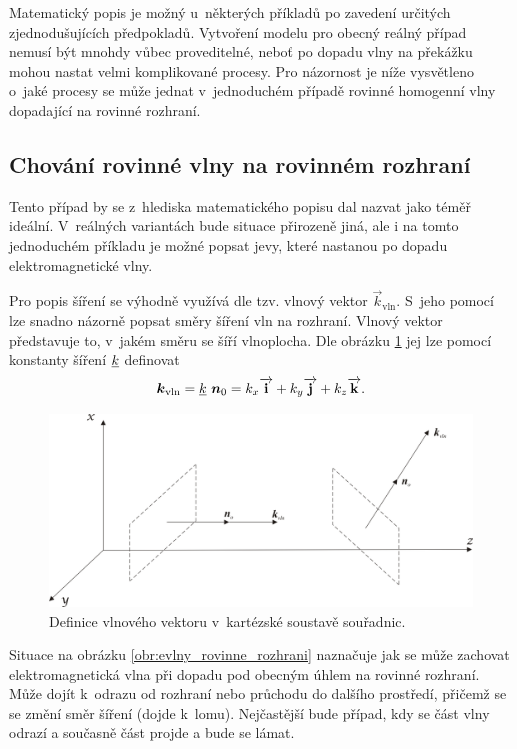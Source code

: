 Matematický popis je možný u~některých příkladů po zavedení určitých zjednodušujících předpokladů. Vytvoření modelu pro obecný reálný případ nemusí být mnohdy vůbec proveditelné, neboť po dopadu vlny na překážku mohou nastat velmi komplikované procesy. Pro názornost je níže vysvětleno o~jaké procesy se může jednat v~jednoduchém případě rovinné homogenní vlny dopadající na rovinné rozhraní.

\subsection*{Chování rovinné vlny na rovinném rozhraní}
Tento případ by se z~hlediska matematického popisu dal nazvat jako téměř ideální. V~reálných variantách bude situace přirozeně jiná, ale i na tomto jednoduchém příkladu je možné popsat jevy, které nastanou po dopadu elektromagnetické vlny. 

Pro popis šíření se výhodně využívá dle \cite[str.47]{emp} tzv. vlnový vektor $\vec k_{\mathrm{vln}}$. S~jeho pomocí lze snadno názorně popsat směry šíření vln na rozhraní. Vlnový vektor představuje to, v~jakém směru se šíří vlnoplocha. Dle obrázku \ref{obr:evlny_vlnovy_vektor} jej lze pomocí konstanty šíření ${\underline{k}}$ definovat
\begin{equation}
	\mbox{\boldmath$k$}_{\mathrm{vln}} = {\underline{k}}~\mbox{\boldmath$n$}_{0} = k_{x}\overrightarrow{\mathrm{\textbf{i}}} + k_{y}\overrightarrow{\mathrm{\textbf{j}}} + k_{z}\overrightarrow{\mathrm{\textbf{k}}}.
	\label{rce:evlny_vlnovy_vektor}
\end{equation}

\begin{figure}[!h]
	\centering
	\includegraphics[width=13cm]{evlny_vlnovy_vektor.png}
	\caption{Definice vlnového vektoru v~kartézské soustavě souřadnic. \cite{emp}}
	\label{obr:evlny_vlnovy_vektor}
\end{figure}

Situace na obrázku \ref{obr:evlny_rovinne_rozhrani} naznačuje jak se může zachovat elektromagnetická vlna při dopadu pod obecným úhlem na rovinné rozhraní. Může dojít k~odrazu od rozhraní nebo průchodu do dalšího prostředí, přičemž se se změní směr šíření (dojde k~lomu). Nejčastější bude případ, kdy se část vlny odrazí a současně část projde a bude se lámat. 

